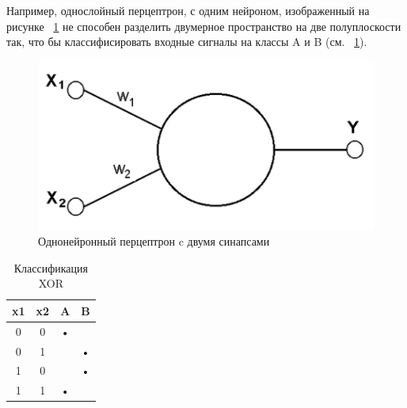 \documentclass[a4paper,english,russian]{G2-105}
\begin{document}
\par Например, однослойный перцептрон, с одним нейроном, изображенный на рисунке ~\ref{single_neuron} не способен разделить двумерное пространство на две
полуплоскости так, что бы классифисировать входные сигналы на классы A и B (см. ~\ref{a_and_b}).
\begin{figure}
\begin{center}
    \includegraphics[width=0.6\linewidth]{single_neuron.png}
    \caption{Однонейронный перцептрон c двумя синапсами}
	\label{single_neuron}
\end{center}
\end{figure}
\begin{longtable}{|c|c|c|c|}
    \caption{Классификация XOR}\\ \hline
    \label{a_and_b} 
    x1 & x2 & A & B \\ \hline
    0  & 0  & • & \hspace*{1mm}  \\ \hline
    0  & 1  & \hspace*{1mm} &  • \\ \hline
    1  & 0  & \hspace*{1mm} &  • \\ \hline
    1  & 1  & • & \hspace*{1mm} \\ \hline
\end{longtable}
\end{document}
